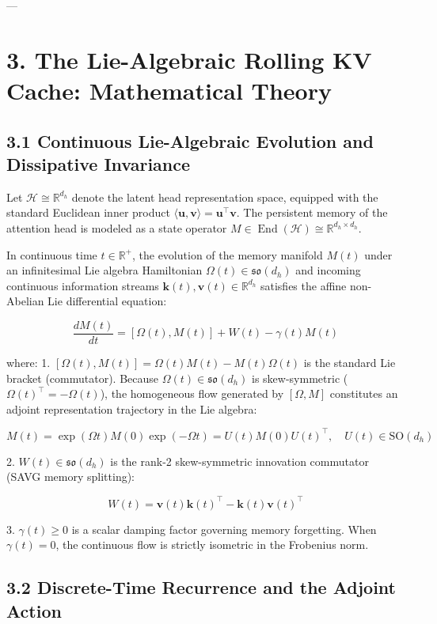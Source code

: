 \documentclass[11pt,twoside,openright]{amsbook}
\begin{document}
{{{{{{{---

\section{3. The Lie-Algebraic Rolling KV Cache: Mathematical Theory}

\subsection{3.1 Continuous Lie-Algebraic Evolution and Dissipative Invariance}

Let $\mathcal{H} \cong \mathbb{R}^{d_h}$ denote the latent head representation space, equipped with the standard Euclidean inner product $\langle \mathbf{u}, \mathbf{v} \rangle = \mathbf{u}^\top \mathbf{v}$. The persistent memory of the attention head is modeled as a state operator $M \in \operatorname{End}(\mathcal{H}) \cong \mathbb{R}^{d_h \times d_h}$.

In continuous time $t \in \mathbb{R}^+$, the evolution of the memory manifold $M(t)$ under an infinitesimal Lie algebra Hamiltonian $\Omega(t) \in \mathfrak{so}(d_h)$ and incoming continuous information streams $\mathbf{k}(t), \mathbf{v}(t) \in \mathbb{R}^{d_h}$ satisfies the affine non-Abelian Lie differential equation:

$$\frac{d M(t)}{d t} = [\Omega(t), M(t)] + W(t) - \gamma(t) M(t)$$

where:
1. $[\Omega(t), M(t)] = \Omega(t) M(t) - M(t) \Omega(t)$ is the standard Lie bracket (commutator). Because $\Omega(t) \in \mathfrak{so}(d_h)$ is skew-symmetric ($\Omega(t)^\top = -\Omega(t)$), the homogeneous flow generated by $[\Omega, M]$ constitutes an adjoint representation trajectory in the Lie algebra:

   $$M(t) = \exp(\Omega t) M(0) \exp(-\Omega t) = U(t) M(0) U(t)^\top, \quad U(t) \in \mathrm{SO}(d_h)$$

2. $W(t) \in \mathfrak{so}(d_h)$ is the rank-2 skew-symmetric innovation commutator (SAVG memory splitting):

   $$W(t) = \mathbf{v}(t) \mathbf{k}(t)^\top - \mathbf{k}(t) \mathbf{v}(t)^\top$$

3. $\gamma(t) \ge 0$ is a scalar damping factor governing memory forgetting. When $\gamma(t) = 0$, the continuous flow is strictly isometric in the Frobenius norm.

\subsection{3.2 Discrete-Time Recurrence and the Adjoint Action}

}}}}}}}
\end{document}
